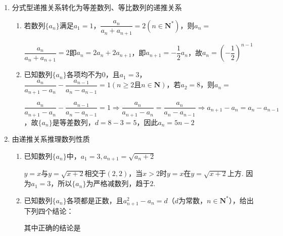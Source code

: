 \begin{enumerate}
    \item 分式型递推关系转化为等差数列、等比数列的递推关系
    \begin{enumerate}
        \item 若数列$\{a_n\}$满足$a_1 = 1$，$\dfrac{a_n}{a_n + a_{n+1}} = 2(n \in \mathbf{N^*})$，则$a_n = $
        \begin{jieda}
            $\dfrac{a_n}{a_n + a_{n+1}} = 2$即$a_n = 2a_n + 2a_{n+1}$，即$a_{n+1} = -\dfrac{1}{2}a_n$，故$a_n = \left ( -\dfrac{1}{2}\right)^{n-1}$
        \end{jieda}
        \item 已知数列$\{a_n\}$各项均不为0，且$a_1 = 3$，$\dfrac{a_n}{a_{n+1} - a_n} - \dfrac{a_{n-1}}{a_n - a_{n-1}} = 1 (n \geq 2 \mbox{且} n \in \mathbf{N})$，若$a_2 = 8$，则$a_n = $
        \begin{jieda}
            $\dfrac{a_n}{a_{n+1} - a_n} - \dfrac{a_{n-1}}{a_n - a_{n-1}} = 1 \Rightarrow \dfrac{a_n}{a_{n+1} - a_n}  =  \dfrac{a_n}{a_n - a_{n-1}} \Rightarrow a_{n+1} - a_n = a_n - a_{n-1}$，故$\{a_n\}$是等差数列，$d = 8 - 3 = 5$，因此$a_n = 5n-2$
        \end{jieda}
    \end{enumerate}
    \item 由递推关系推理数列性质
    \begin{enumerate}
        \item 已知数列$\{a_n\}$中，$a_1 = 3, a_{n+1} = \sqrt{a_n + 2}$ 
        \begin{jieda}
            $y = x$与$y = \sqrt{x+2}$相交于$(2,2)$，当$x > 2$时$y = x$在$y = \sqrt{x+2}$上方. 因为$a_1 = 3$，所以$\{a_n\}$为严格减数列，趋于$2$.
        \end{jieda}
        \item 已知数列$\{a_n\}$各项都是正数，且$a^2_{n+1} - a_n = d$（$d$为常数，$n \in \mathbf{N^*}$），给出下列四个结论：
        其中正确的结论是

\end{enumerate}
\end{enumerate}
